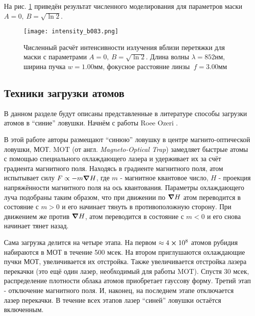 \documentclass[12pt]{article}
\begin{document}
        На рис. \ref{fig:intensity_b083} приведён результат численного моделирования для параметров маски $A=0,\ B=\sqrt{\ln2}$.

        \begin{figure}
            \center
            \texttt{[image: intensity\_b083.png]}
            \caption{Численный расчёт интенсивности излучения вблизи перетяжки для маски с параметрами $A=0,\ B=\sqrt{\ln2}$.
                Длина волны $\lambda = 852$нм, ширина пучка $w=1.00$мм, фокусное расстояние линзы $\ f=3.00$мм}
            \label{fig:intensity_b083}
        \end{figure}


        \subsection{Техники загрузки атомов}
        В данном разделе будут описаны представленные в литературе способы загрузки атомов в \enquote{синие} ловушки. Начнём с
        работы Roee Ozeri \cite{ozeri1999long}.

        В этой работе авторы размещают \enquote{синюю} ловушку в центре магнито-оптической ловушки, МОТ.
        MOT (от англ. \textit{Magneto-Optical Trap}) замедляет быстрые атомы с помощью специального
        охлаждающего лазера и удерживает их за счёт градиента магнитного поля. Находясь в градиенте
        магнитного поля, атом испытывает силу $F \propto -m\grad{H}$, где $m$ - магнитное квантовое число,
        $H$ - проекция напряжённости магнитного поля на ось квантования. Параметры охлаждающего луча подобраны
        таким образом, что при движении по $\grad{H}$ атом переводится в состояние с $m > 0$ и его начинает
        тянуть в противоположную сторону. При движением же против $\grad{H}$, атом переводится в
        состояние с $m < 0$ и его снова начинает тянет назад. 
        
        Сама загрузка делится на четыре этапа. На первом $\approx4\cross10^8$ атомов рубидия набираются в МОТ в
        течение 500 мсек. На втором приглушаются охлаждающие пучки МОТ, увеличивается их отстройка. Также
        увеличивается отстройка лазера перекачки (это ещё один лазер, необходимый для работы MOT). Спустя
        30 мсек, распределение плотности облака атомов приобретает гауссову форму. Третий этап - отключение
        магнитного поля. И, наконец, на последнем этапе отключается лазер перекачки. В течение всех этапов
        лазер \enquote{синей} ловушки остаётся включенным.
\end{document}
